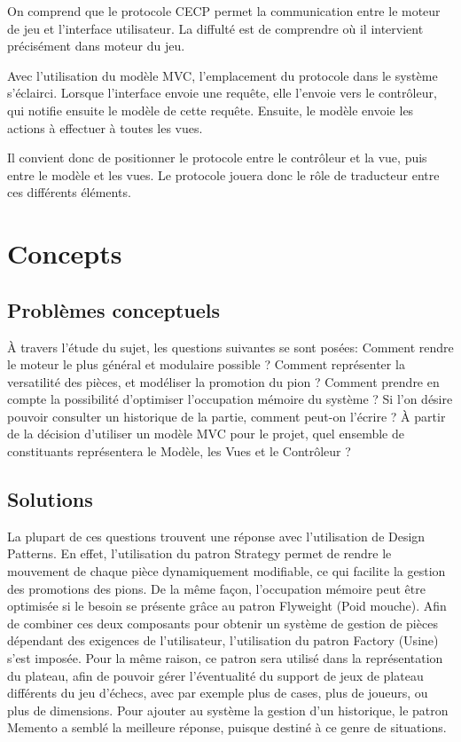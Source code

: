 \documentclass[11pt]{article}
\begin{document}
    On comprend que le protocole CECP permet la communication entre le moteur de jeu et l'interface utilisateur. La diffulté est de comprendre où il intervient précisément dans moteur du jeu.

    Avec l'utilisation du modèle MVC, l'emplacement du protocole dans le système s'éclairci. Lorsque l'interface envoie une requête, elle l'envoie vers le contrôleur, qui notifie ensuite le modèle de cette requête. Ensuite, le modèle envoie les actions à effectuer à toutes les vues. 

    Il convient donc de positionner le protocole entre le contrôleur et la vue, puis entre le modèle et les vues. Le protocole jouera donc le rôle de traducteur entre ces différents éléments.
\section{Concepts}
\label{sec-2}
\subsection{Problèmes conceptuels}
\label{sec-2-1}
À travers l'étude du sujet, les questions suivantes se sont posées: Comment rendre le moteur le plus général et modulaire possible ? Comment représenter la versatilité des pièces, et modéliser la promotion du pion ? Comment prendre en compte la possibilité d'optimiser l'occupation mémoire du système ? Si l'on désire pouvoir consulter un historique de la partie, comment peut-on l'écrire ? À partir de la décision d'utiliser un modèle MVC pour le projet, quel ensemble de constituants représentera le Modèle, les Vues et le Contrôleur ?

\subsection{Solutions}
\label{sec-2-2}
La plupart de ces questions trouvent une réponse avec l'utilisation de Design Patterns. En effet, l'utilisation du patron Strategy permet de rendre le mouvement de chaque pièce dynamiquement modifiable, ce qui facilite la gestion des promotions des pions. De la même façon, l'occupation mémoire peut être optimisée si le besoin se présente grâce au patron Flyweight (Poid mouche). Afin de combiner ces deux composants pour obtenir un système de gestion de pièces dépendant des exigences de l'utilisateur, l'utilisation du patron Factory (Usine) s'est imposée. Pour la même raison, ce patron sera utilisé dans la représentation du plateau, afin de pouvoir gérer l'éventualité du support de jeux de plateau différents du jeu d'échecs, avec par exemple plus de cases, plus de joueurs, ou plus de dimensions. Pour ajouter au système la gestion d'un historique, le patron Memento a semblé la meilleure réponse, puisque destiné à ce genre de situations.
\end{document}
